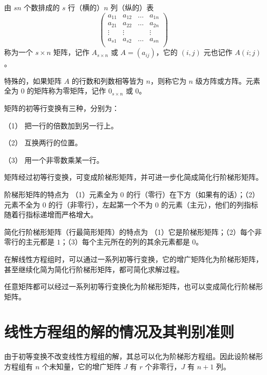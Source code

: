 \begin{definition}
	由 $sn$ 个数排成的 $s$ 行（横的）$n$ 列（纵的）表
	\begin{equation*}
		\left(
			\begin{matrix}
				a_{11}&a_{12}&\ldots&a_{1n}\\
				a_{21}&a_{22}&\ldots&a_{2n}\\
				\vdots&\vdots&&\vdots\\a_{s1}&a_{s2}&\ldots&a_{sn}\\
			\end{matrix}
		\right)
	\end{equation*}
	称为一个 $s\times n$ 矩阵，记作 $A_{s\times n}$ 或 $A=(a_{ij})$，它的 $(i,j)$ 元也记作 $A(i;j)$。
\end{definition}

特殊的，如果矩阵 $A$ 的行数和列数相等皆为 $n$，则称它为 $n$ 级方阵或方阵。元素全为 $0$ 的矩阵称为零矩阵，记作 $0_{s\times n}$ 或 $0$。

\begin{definition}[初等行变换]
	矩阵的初等行变换有三种，分别为：
	
	（1） 把一行的倍数加到另一行上。

	（2） 互换两行的位置。

	（3） 用一个非零数乘某一行。
\end{definition}

矩阵经过初等行变换，可变成阶梯形矩阵，并可进一步化简成简化行阶梯形矩阵。

阶梯形矩阵的特点为 （1）元素全为 $0$ 的行（零行）在下方（如果有的话）；（2）元素不全为 $0$ 的行（非零行），左起第一个不为 $0$ 的元素（主元），他们的列指标随着行指标递增而严格增大。

简化行阶梯形矩阵（行最简形矩阵）的特点为 （1）它是阶梯形矩阵；（2）每个非零行的主元都是 $1$；（3）每个主元所在的列的其余元素都是 $0$。

在解线性方程组时，可以通过一系列初等行变换，它的增广矩阵化为阶梯形矩阵，甚至继续化简为简化行阶梯形矩阵，都可简化求解过程。

\begin{theorem}
	任意矩阵都可以经过一系列初等行变换化为阶梯形矩阵，也可以变成简化行阶梯形矩阵。
\end{theorem}

\section{线性方程组的解的情况及其判别准则}


由于初等变换不改变线性方程组的解，其总可以化为阶梯形方程组。因此设阶梯形方程组有 $n$ 个未知量，它的增广矩阵 $J$ 有 $r$ 个非零行，$J$ 有 $n+1$ 列。

